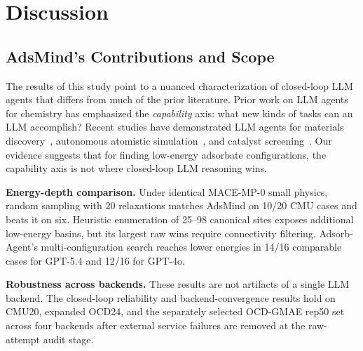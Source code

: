 \section{Discussion}

\subsection{AdsMind's Contributions and Scope}

The results of this study point to a nuanced characterization of closed-loop LLM agents that differs from much of the prior literature.
Prior work on LLM agents for chemistry has emphasized the \textit{capability} axis: what new kinds of tasks can an LLM accomplish?
Recent studies have demonstrated LLM agents for materials discovery~\cite{zhang2026towards,zhang2026matclaw,li2026agentic}, autonomous atomistic simulation~\cite{huang2026towards,yang2026quasar}, and catalyst screening~\cite{chandrasekhar2026catalyst,mok2026reasoning}.
Our evidence suggests that for finding low-energy adsorbate configurations, the capability axis is not where closed-loop LLM reasoning wins.

\textbf{Energy-depth comparison.}
Under identical MACE-MP-0 small physics, random sampling with 20 relaxations matches AdsMind on 10/20 CMU cases and beats it on six.
Heuristic enumeration of 25--98 canonical sites exposes additional low-energy basins, but its largest raw wins require connectivity filtering.
Adsorb-Agent's multi-configuration search reaches lower energies in 14/16 comparable cases for GPT-5.4 and 12/16 for GPT-4o.

\textbf{Robustness across backends.}
These results are not artifacts of a single LLM backend.
The closed-loop reliability and backend-convergence results hold on CMU20, expanded OCD24, and the separately selected OCD-GMAE rep50 set across four backends after external service failures are removed at the raw-attempt audit stage.

